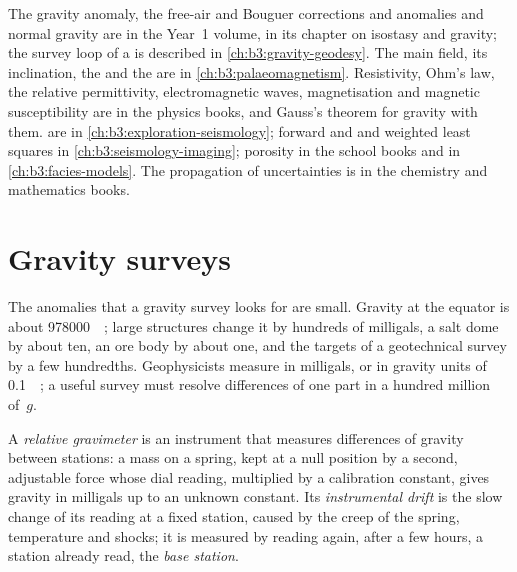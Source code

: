 \begin{recall}
The gravity anomaly, the free-air and Bouguer corrections and anomalies
and normal gravity are in the Year~1 volume, in its chapter on isostasy
and gravity; the survey loop of a  is described in
\cref{ch:b3:gravity-geodesy}. The main field, its inclination, the
 and the  are in
\cref{ch:b3:palaeomagnetism}. Resistivity, Ohm's law, the relative
permittivity, electromagnetic waves, magnetisation and magnetic
susceptibility are in the physics books, and Gauss's theorem for
gravity with them.  are in
\cref{ch:b3:exploration-seismology}; forward and  and
weighted least squares in \cref{ch:b3:seismology-imaging}; porosity in
the school books and  in \cref{ch:b3:facies-models}. The
propagation of uncertainties is in the chemistry and mathematics books.
\end{recall}

\section{Gravity surveys}\label{sec:b3:field-lab-methods-3:gravity}

The anomalies that a gravity survey looks for are small. Gravity at the
equator is about \qty{978000}{\milli\gal}; large structures change it
by hundreds of milligals, a salt dome by about ten, an ore body by
about one, and the targets of a geotechnical survey by a few
hundredths. Geophysicists measure in
milligals, or in gravity units of \qty{0.1}{\milli\gal}; a useful survey
must resolve differences of one part in a hundred million of~$g$.

\begin{definition}\label{def:b3:field-lab-methods-3:gravimeter}
A \emph{relative gravimeter} is an
instrument that measures differences of gravity between stations: a
mass on a spring, kept at a null position by a second, adjustable force
whose dial reading, multiplied by a calibration constant, gives gravity
in milligals up to an unknown constant. Its \emph{instrumental
drift} is the slow change of its reading at a
fixed station, caused by the creep of the spring, temperature and
shocks; it is measured by reading again, after a few hours, a station
already read, the \emph{base station}.
\end{definition}

